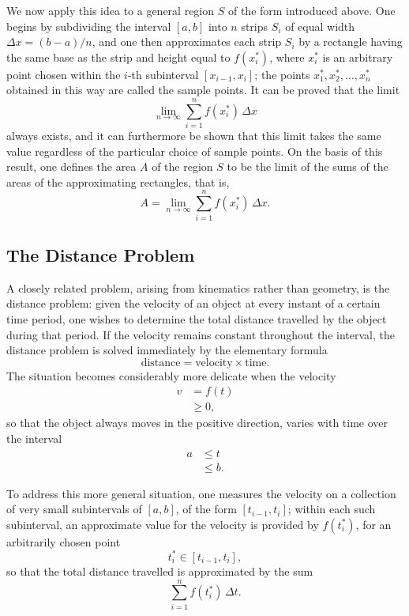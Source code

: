 We now apply this idea to a general region $S$ of the form introduced above. One begins by subdividing the interval $[a,b]$ into $n$ strips $S_i$ of equal width $\Delta x = (b-a)/n$, and one then approximates each strip $S_i$ by a rectangle having the same base as the strip and height equal to $f(x_i^*)$, where $x_i^*$ is an arbitrary point chosen within the $i$-th subinterval $[x_{i-1}, x_i]$; the points $x_1^*, x_2^*, \ldots, x_n^*$ obtained in this way are called the sample points. It can be proved that the limit \[
\lim_{n \to \infty} \sum_{i=1}^{n} f(x_i^*) \, \Delta x
\] always exists, and it can furthermore be shown that this limit takes the same value regardless of the particular choice of sample points. On the basis of this result, one defines the area $A$ of the region $S$ to be the limit of the sums of the areas of the approximating rectangles, that is,
\[
A = \lim_{n \to \infty} \sum_{i=1}^{n} f(x_i^*) \, \Delta x.
\]

\subsection{The Distance Problem}

A closely related problem, arising from kinematics rather than geometry, is the distance problem: given the velocity of an object at every instant of a certain time period, one wishes to determine the total distance travelled by the object during that period. If the velocity remains constant throughout the interval, the distance problem is solved immediately by the elementary formula
\[
\text{distance} = \text{velocity} \times \text{time}.
\]
The situation becomes considerably more delicate when the velocity
\[
\begin{aligned}
v &= f(t) \\
&\geq 0,
\end{aligned}
\]
so that the object always moves in the positive direction, varies with time over the interval
\[
\begin{aligned}
a &\leq t \\
&\leq b.
\end{aligned}
\]

To address this more general situation, one measures the velocity on a collection of very small subintervals of $[a,b]$, of the form $[t_{i-1}, t_i]$; within each such subinterval, an approximate value for the velocity is provided by $f(t_i^*)$, for an arbitrarily chosen point
\[
t_i^* \in [t_{i-1}, t_i],
\]
so that the total distance travelled is approximated by the sum
\[
\sum_{i=1}^{n} f(t_i^*) \, \Delta t.
\]

